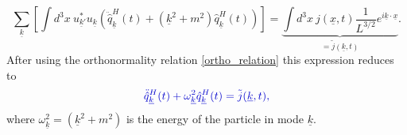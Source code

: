 \documentclass[12pt, titlepage]{article}
\begin{document}
\begin{equation}
 \sum_{\underline{k}}
 \left[ 
 \int d^{3}x \ u^{\ast}_{\underline{k}'}u_{\underline{k}}
 \left( 
 \ddot{\hat{q}}^{H}_{\underline{k}}(t) 
 +
 \left( \underline{k}^{2}+m^{2}\right) 
 \hat{q}^{H}_{\underline{k}}(t) 
 \right) 
  \right] 
  ={\underbrace{\int d^{3}x \ 
j(\underline{x},t) \dfrac{1}{L^{3/2}} e^{i\underline{k}\cdot\underline{x}}}_{=\tilde{j}(\underline{k},t)}}
  .
\end{equation}
After using the orthonormality relation \eqref{ortho_relation} this expression reduces to
\begin{equation}\label{eq_for_q}
 \textcolor[RGB]{0,0,204}{
\ddot{\hat{q}}^{H}_{\underline{k}}(t) 
 +
\omega_{\underline{k}}^{2}
 \hat{q}^{H}_{\underline{k}}(t) 
  =\tilde{j}(\underline{k},t)
  ,}
\end{equation}
where  $ \omega_{\underline{k}}^{2} = (\underline{k}^{2}+m^{2})  $ is the energy of the particle in mode $ \underline{k} $.
\end{document}
